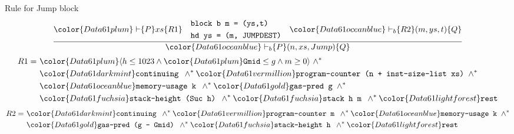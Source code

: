\documentclass{beamer}
\begin{document}
\begin{frame}{Rule for Jump block}
	\footnotesize
	$$\frac{{\color{Data61 plum}\vdash} \{P\} xs \{R1\}
	\quad \begin{aligned}
	&\texttt{block b m = (ys,t)}\\
	&\texttt{hd ys = (m, JUMPDEST)}\\
	\end{aligned}
	\quad {\color{Data61 ocean blue}\vdash_b} \{R2\} (m,ys,t) \{Q\}}
	{{\color{Data61 ocean blue}\vdash_b} \{P\} (n,xs,Jump) \{Q\}}$$
	\small
	\begin{align*}
	R1 = ~& {\color{Data61 plum}\langle h \leq 1023 \wedge \color{Data61 plum}\texttt{Gmid} \leq g \wedge m \geq 0 \rangle}~ \wedge^* \\
	&{\color{Data61 dark mint}\texttt{continuing }} \wedge^*
	{\color{Data61 vermillion}\texttt{program-counter (n + inst-size-list xs) }}\wedge^*\\
	&{\color{Data61 ocean blue}\texttt{memory-usage k }} \wedge^*
	{\color{Data61 gold}\texttt{gas-pred g }} \wedge^*\\
	&{\color{Data61 fuchsia}\texttt{stack-height (Suc h) }} \wedge^*
	{\color{Data61 fuchsia}\texttt{stack h m }} \wedge^*
	{\color{Data61 light forest}\texttt{rest}}\\
	\end{align*}
	\begin{align*}
	R2 = ~&{\color{Data61 dark mint}\texttt{continuing }} \wedge^*
	{\color{Data61 vermillion}\texttt{program-counter m }}\wedge^*
	{\color{Data61 ocean blue}\texttt{memory-usage k }} \wedge^*\\
	&{\color{Data61 gold}\texttt{gas-pred (g - Gmid) }} \wedge^*
	{\color{Data61 fuchsia}\texttt{stack-height h }} \wedge^*
	{\color{Data61 light forest}\texttt{rest}}\\
	\end{align*}
\end{frame}
\end{document}
